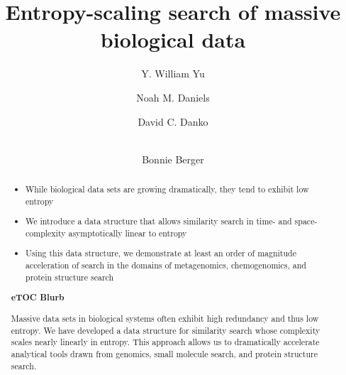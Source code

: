 \documentclass[review,preprint,12pt]{elsarticle}
\theoremstyle{definition}
\theoremstyle{remark}
\numberwithin{equation}{section}
\begin{document}
\begin{frontmatter}

\title{ %
Entropy-scaling search of massive biological data}

\author[mitmath,mitcsail]{Y. William Yu}
\author[mitmath,mitcsail]{Noah M. Daniels}
\author[mitcsail]{David C. Danko}
\author[mitmath,mitcsail]{\\Bonnie Berger}
\address[mitmath]{Department of Mathematics, Massachusetts Institute of Technology, Cambridge, Massachusetts 02139}
\address[mitcsail]{Computer Science and AI Lab, Massachusetts Institute of Technology, Cambridge, Massachusetts 02139}






\begin{abstract}
    \begin{itemize}
        \item While biological data sets are growing dramatically, they tend to exhibit low entropy
        \item We introduce a data structure that allows similarity search in time- and space-complexity asymptotically linear to entropy
        \item Using this data structure, we demonstrate at least an order of magnitude acceleration of search in the domains of metagenomics, chemogenomics, and protein structure search
    \end{itemize}
\noindent\unskip\textbf{eTOC Blurb}
\par\medskip\noindent\unskip\ignorespaces
Massive data sets in biological systems often exhibit high redundancy and thus low entropy.
We have developed a data structure for similarity search whose complexity scales nearly linearly in entropy.
This approach allows us to dramatically accelerate analytical tools drawn from genomics, small molecule search, and protein structure search.
\end{abstract}

\end{frontmatter}
\end{document}
